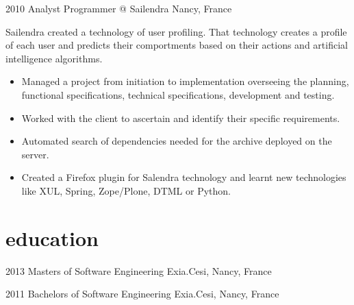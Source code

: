 \documentclass[]{friggeri-cv} %
\begin{document}

\begin{entrylist}

\entry
{2010}
{Analyst Programmer} 
{@ Sailendra}
{Nancy, France}
{Sailendra created a technology of user profiling. That technology creates a profile of each user and predicts their comportments based on their actions and artificial intelligence algorithms.\\

\vspace{-4mm}
\begin{itemize}
	\item Managed a project from initiation to implementation overseeing the planning, functional specifications, technical specifications, development and testing.
	\item Worked with the client to ascertain and identify their specific requirements.
	\item Automated search of dependencies needed for the archive deployed on the server.
    \item Created a Firefox plugin for Salendra technology and learnt new technologies like XUL, Spring, Zope/Plone, DTML or Python.
\end{itemize}}
\vspace{-7mm}

\end{entrylist}


\section{education}

\begin{entrylist}


\entry
{2013}
{Masters {\normalfont of Software Engineering}}
{}
{Exia.Cesi, Nancy, France}
{}


\entry
{2011}
{Bachelors {\normalfont of Software Engineering}}
{}
{Exia.Cesi, Nancy, France}
{}


\end{entrylist}
\end{document}
